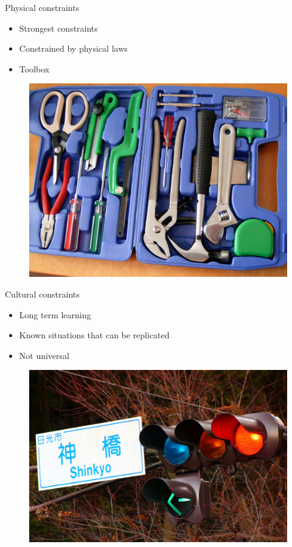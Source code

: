 \documentclass{beamer}
\begin{document}
\begin{frame}{Physical constraints}
    		 \begin{itemize}
    		 \item Strongest constraints
    		 \item Constrained by physical laws
    		 \item Toolbox
    		 \end{itemize}
             \begin{figure}
             \includegraphics[scale=0.1]{toolbox.jpg}
             \end{figure}
             
\end{frame}

\begin{frame}{Cultural constraints}
    \begin{itemize}
		\item Long term learning
    		\item Known situations that can be replicated
    		\item Not universal   
    \end{itemize}
    \begin{figure}[ht]
    \includegraphics[scale=0.1]{japan-traffic-light.jpg}
    \end{figure}
\end{frame}
    
\end{document}
